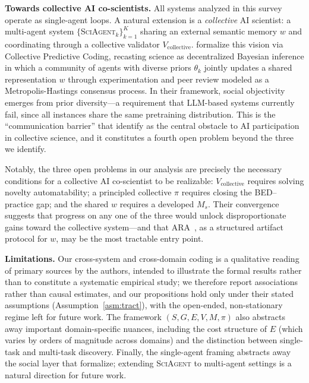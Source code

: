 \documentclass[11pt]{article}
\newcommand{\sgmvpi}{$(S, G, E, V, M, \pi)$}
\newcommand{\framework}{\textsc{SciAgent}}
\begin{document}
\textbf{Towards collective AI co-scientists.} All systems analyzed in this survey operate as single-agent loops. A natural extension is a \emph{collective} AI scientist: a multi-agent system $\{$\framework$_k\}_{k=1}^K$ sharing an external semantic memory $w$ and coordinating through a collective validator $V_\text{collective}$. \citet{taniguchi2024cpc} formalize this vision via Collective Predictive Coding, recasting science as decentralized Bayesian inference in which a community of agents with diverse priors $\theta_k$ jointly updates a shared representation $w$ through experimentation and peer review modeled as a Metropolis-Hastings consensus process. In their framework, social objectivity emerges from prior diversity---a requirement that LLM-based systems currently fail, since all instances share the same pretraining distribution. This is the ``communication barrier'' that \citet{taniguchi2024cpc} identify as the central obstacle to AI participation in collective science, and it constitutes a fourth open problem beyond the three we identify.

Notably, the three open problems in our analysis are precisely the necessary conditions for a collective AI co-scientist to be realizable: $V_\text{collective}$ requires solving novelty automatability; a principled collective $\pi$ requires closing the BED--practice gap; and the shared $w$ requires a developed $M_s$. Their convergence suggests that progress on any one of the three would unlock disproportionate gains toward the collective system---and that ARA~\citep{liu2026lasthuman}, as a structured artifact protocol for $w$, may be the most tractable entry point.

\textbf{Limitations.} Our cross-system and cross-domain coding is a qualitative reading of primary sources by the authors, intended to illustrate the formal results rather than to constitute a systematic empirical study; we therefore report associations rather than causal estimates, and our propositions hold only under their stated assumptions (Assumption~\ref{asm:tract}), with the open-ended, non-stationary regime left for future work. The framework \sgmvpi{} also abstracts away important domain-specific nuances, including the cost structure of $E$ (which varies by orders of magnitude across domains) and the distinction between single-task and multi-task discovery. Finally, the single-agent framing abstracts away the social layer that \citet{taniguchi2024cpc} formalize; extending \framework{} to multi-agent settings is a natural direction for future work.
\end{document}

